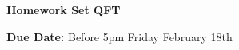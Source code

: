 


\thispagestyle{fancy}






\begin{center}
{\huge \textbf{Homework Set QFT}}
\large

{\textbf{ Due Date:} Before 5pm Friday February 18th  } 
\end{center}

